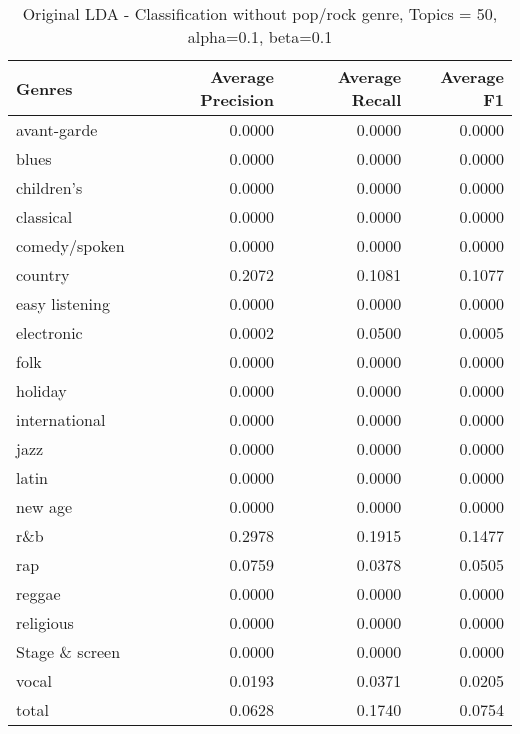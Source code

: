 \begin{table}[h!]
\begin{tabular}{|l|r|r|r|}

\hline
\textbf{Genres} &  \textbf{Average Precision} & \textbf{Average Recall} & \textbf{Average F1} \\
\hline
avant-garde & 0.0000	& 0.0000& 	0.0000\\
blues& 0.0000& 	0.0000	& 0.0000\\
children's& 0.0000& 	0.0000	& 0.0000\\
classical& 0.0000& 	0.0000& 	0.0000\\
comedy/spoken& 0.0000& 	0.0000& 	0.0000\\
country& 0.2072& 	0.1081	& 0.1077\\
easy listening& 0.0000& 	0.0000	& 0.0000\\
electronic& 0.0002& 	0.0500& 	0.0005\\
folk& 0.0000& 	0.0000& 	0.0000\\
holiday& 0.0000& 	0.0000& 	0.0000\\
international& 0.0000& 	0.0000& 	0.0000\\
jazz& 0.0000& 	0.0000	& 0.0000\\
latin& 0.0000	& 0.0000& 	0.0000\\
new age& 0.0000& 	0.0000& 	0.0000\\
r\&b& 0.2978	& 0.1915& 	0.1477\\
rap& 0.0759& 	0.0378& 	0.0505\\
reggae& 0.0000& 	0.0000& 0.0000\\
religious& 0.0000	& 0.0000& 	0.0000\\
Stage \& screen& 0.0000	& 0.0000& 	0.0000\\
vocal& 0.0193& 	0.0371& 	0.0205\\
total& 0.0628& 	0.1740& 	0.0754\\
\hline
\end{tabular}
\caption{Original LDA - Classification without pop/rock genre, Topics = 50, alpha=0.1, beta=0.1}
\end{table}